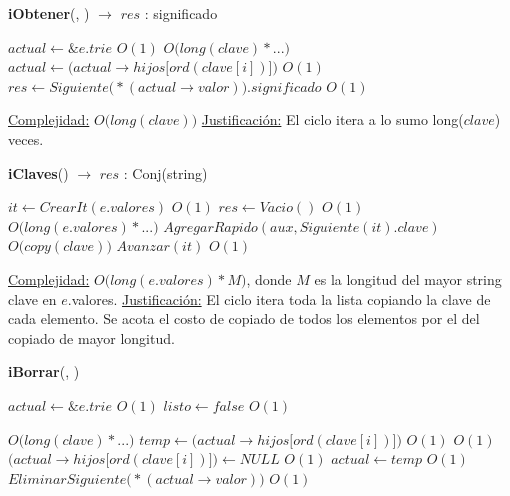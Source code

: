 \begin{Algoritmos}
\begin{algorithm}[H]{\textbf{iObtener}(, ) $\to$ $res$ : significado}
      \begin{algorithmic}
        \State $actual \gets \&e.trie$     \Comment $O(1)$
             \Comment $O\big(long(clave) * ...\big)$
          \State $actual \gets \big(actual \to hijos\big[ord(clave[i])\big]\big)$ \Comment $O(1)$
        \EndFor
        \State $res \gets Siguiente\big(*(actual \to valor)\big).significado$ \Comment $O(1)$

        \medskip
        \Statex \underline{Complejidad:} {$O\big(long(clave)\big)$}
        \Statex \underline{Justificación:} {El ciclo itera a lo sumo long($clave$) veces.}
      \end{algorithmic}
\end{algorithm}

\begin{algorithm}[H]{\textbf{iClaves}() $\to$ $res$ : Conj(string)}
      \begin{algorithmic}
        \State $it \gets CrearIt(e.valores)$     \Comment $O(1)$
        \State $res \gets Vacio()$                     \Comment $O(1)$
         \Comment $O\big(long(e.valores) * ...\big)$
          \State $AgregarRapido(aux, Siguiente(it).clave)$ \Comment $O\big(copy(clave)\big)$
          \State $Avanzar(it)$ \Comment $O(1)$
        \EndWhile

        \medskip
        \Statex \underline{Complejidad:} {$O\big(long(e.valores) * M\big)$, donde $M$ es la longitud del mayor string clave en $e$.valores.}
        \Statex \underline{Justificación:} {El ciclo itera toda la lista copiando la clave de cada elemento. Se acota el costo de copiado de todos los elementos por el del copiado de mayor longitud.}
      \end{algorithmic}
\end{algorithm}

\begin{algorithm}[H]{\textbf{iBorrar}(, )}
      \begin{algorithmic}
        \State $actual \gets \&e.trie$ \Comment $O(1)$
        \State $listo \gets false$ \Comment $O(1)$

             \Comment $O\big(long(clave) * ...\big)$
          \State $temp \gets \big(actual \to hijos\big[ord(clave[i])\big]\big)$  \Comment $O(1)$
           \Comment $O(1)$
            \State $\big(actual \to hijos\big[ord(clave[i])\big]\big) \gets NULL$ \Comment $O(1)$
          \EndIf
          \State $actual \gets temp$ \Comment $O(1)$
        \EndFor
        \State $EliminarSiguiente\big(*(actual \to valor)\big)$ \Comment $O(1)$
        \State $ $


\end{algorithmic}
\end{algorithm}
\end{Algoritmos}
